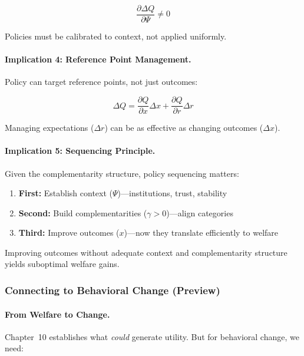 \begin{equation}
\frac{\partial \Delta Q}{\partial \Psi} \neq 0
\end{equation}

Policies must be calibrated to context, not applied uniformly.

\paragraph{Implication 4: Reference Point Management.}
Policy can target reference points, not just outcomes:

\begin{equation}
\Delta Q = \frac{\partial Q}{\partial x} \Delta x + \frac{\partial Q}{\partial r} \Delta r
\end{equation}

Managing expectations ($\Delta r$) can be as effective as changing outcomes ($\Delta x$).

\paragraph{Implication 5: Sequencing Principle.}
Given the complementarity structure, policy sequencing matters:

\begin{tcolorbox}[colback=yellow!10!white, colframe=yellow!50!black, title=The Sequencing Principle]
\begin{enumerate}
\item \textbf{First:} Establish context ($\Psi$)---institutions, trust, stability
\item \textbf{Second:} Build complementarities ($\gamma > 0$)---align categories
\item \textbf{Third:} Improve outcomes ($x$)---now they translate efficiently to welfare
\end{enumerate}

Improving outcomes without adequate context and complementarity structure 
yields suboptimal welfare gains.
\end{tcolorbox}

\subsubsection{Connecting to Behavioral Change (Preview)}

\paragraph{From Welfare to Change.}
Chapter~10 establishes what \emph{could} generate utility. But for behavioral 
change, we need:

